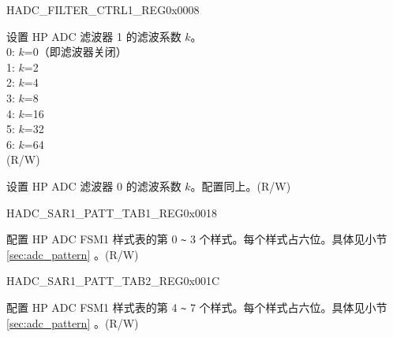\begin{register}{H}{ADC\_FILTER\_CTRL1\_REG}{0x0008}\label{regdesc:ADCFILTERCTRL1REG}
%
%
%
\regnewline%
\begin{regdesc}\begin{reglist}
\label{fielddesc:ADCFILTERFACTOR1}\item [ADC\_FILTER\_FACTOR1]
设置 HP ADC 滤波器 1 的滤波系数 \(k\)。\\
0: \(k\)=0（即滤波器关闭）\\
1: \(k\)=2\\
2: \(k\)=4\\
3: \(k\)=8\\
4: \(k\)=16\\
5: \(k\)=32\\
6: \(k\)=64\\
(R/W)
\label{fielddesc:ADCFILTERFACTOR0}\item [ADC\_FILTER\_FACTOR0]
设置 HP ADC 滤波器 0 的滤波系数 \(k\)。配置同上。(R/W)
\end{reglist}\end{regdesc}
\end{register}


\begin{register}{H}{ADC\_SAR1\_PATT\_TAB1\_REG}{0x0018}\label{regdesc:ADCSAR1PATTTAB1REG}
%
%
\regnewline%
\begin{regdesc}\begin{reglist}
\label{fielddesc:ADCSAR1PATTTAB1}\item [ADC\_SAR1\_PATT\_TAB1] 配置 HP ADC FSM1 样式表的第 0 \verb+~+ 3 个样式。每个样式占六位。具体见小节 \ref{sec:adc_pattern} \textit{}。(R/W)
\end{reglist}\end{regdesc}
\end{register}


\begin{register}{H}{ADC\_SAR1\_PATT\_TAB2\_REG}{0x001C}\label{regdesc:ADCSAR1PATTTAB2REG}
%
%
\regnewline%
\begin{regdesc}\begin{reglist}
\label{fielddesc:ADCSAR1PATTTAB2}\item [ADC\_SAR1\_PATT\_TAB2] 配置 HP ADC FSM1 样式表的第 4 \verb+~+ 7 个样式。每个样式占六位。具体见小节 \ref{sec:adc_pattern} \textit{}。(R/W)
\end{reglist}\end{regdesc}
\end{register}


